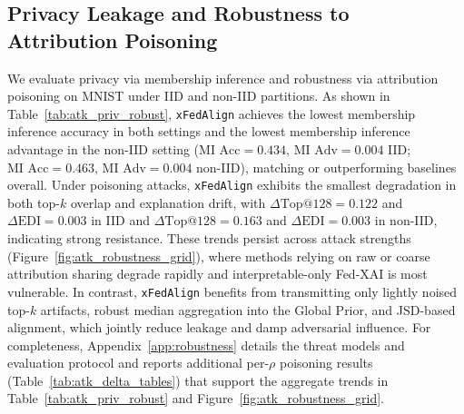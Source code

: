 \documentclass{article}
\theoremstyle{plain}
\theoremstyle{definition}
\theoremstyle{remark}
\begin{document}
\subsection{Privacy Leakage and Robustness to Attribution Poisoning}

We evaluate privacy via membership inference and robustness via attribution poisoning on MNIST under IID and non-IID partitions. As shown in Table~\ref{tab:atk_priv_robust}, \texttt{xFedAlign} achieves the lowest membership inference accuracy in both settings and the lowest membership inference advantage in the non-IID setting (\(\text{MI Acc}=0.434,\,\text{MI Adv}=0.004\) IID; \(\text{MI Acc}=0.463,\,\text{MI Adv}=0.004\) non-IID), matching or outperforming baselines overall. Under poisoning attacks, \texttt{xFedAlign} exhibits the smallest degradation in both top-\(k\) overlap and explanation drift, with \(\Delta\text{Top}@128=0.122\) and \(\Delta\text{EDI}=0.003\) in IID and \(\Delta\text{Top}@128=0.163\) and \(\Delta\text{EDI}=0.003\) in non-IID, indicating strong resistance. These trends persist across attack strengths (Figure~\ref{fig:atk_robustness_grid}), where methods relying on raw or coarse attribution sharing degrade rapidly and interpretable-only Fed-XAI is most vulnerable. In contrast, \texttt{xFedAlign} benefits from transmitting only lightly noised top-\(k\) artifacts, robust median aggregation into the Global Prior, and JSD-based alignment, which jointly reduce leakage and damp adversarial influence.  For completeness, Appendix~\ref{app:robustness} details the threat models and evaluation protocol and reports additional per-$\rho$ poisoning results (Table~\ref{tab:atk_delta_tables}) that support the aggregate trends in Table~\ref{tab:atk_priv_robust} and Figure~\ref{fig:atk_robustness_grid}.
\end{document}
